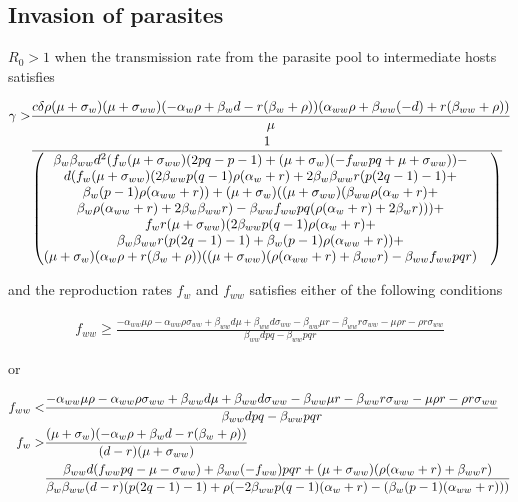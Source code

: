 \documentclass[11pt]{article}
\begin{document}
\subsection*{Invasion of parasites}

$R_0 > 1$ when the transmission rate from the parasite pool to intermediate hosts satisfies

\begin{align}
	\gamma > & \frac{c \delta  \rho  (\mu + \sigma_w) (\mu + \sigma_{ww}) (-\alpha_w \rho + \beta_w d-r (\beta_w+\rho )) (\alpha_{ww} \rho + \beta_{ww} (-d)+r (\beta_{ww}+\rho ))}{\mu } \notag \\
	& \frac{1}{\begin{pmatrix}
		\beta_w \beta_{ww} d^2 (f_w (\mu +\sigma_{ww}) (2 p q-p-1) + (\mu +\sigma_w) (-f_{ww} p q+\mu +\sigma_{ww})) - & \\
		 d (f_w (\mu +\sigma_{ww}) (2 \beta_{ww} p (q-1) \rho  (\alpha_w+r)+2 \beta_w \beta_{ww} r (p (2 q-1)-1)+ & \\
		 \beta_w (p-1) \rho  (\alpha_{ww}+r)) + (\mu +\sigma_w) ((\mu +\sigma_{ww}) (\beta_{ww} \rho  (\alpha_w+r) + & \\ 
		 \beta_w \rho  (\alpha_{ww}+r)+2 \beta_w \beta_{ww} r)-\beta_{ww} f_{ww} p q (\rho  (\alpha_w+r)+2 \beta_w r))) + & \\
		 f_w r (\mu +\sigma_{ww}) (2 \beta_{ww} p (q-1) \rho  (\alpha_w+r) +  & \\
		 \beta_w \beta_{ww} r (p (2 q-1)-1) + \beta_w (p-1) \rho  (\alpha_{ww}+r)) + & \\
		 (\mu +\sigma_w) (\alpha_w \rho +r (\beta_w+\rho )) ((\mu +\sigma_{ww}) (\rho  (\alpha_{ww}+r)+\beta_{ww} r)-\beta_{ww} f_{ww} p q r)
		\end{pmatrix}}
\end{align}

and the reproduction rates $f_w$ and $f_{ww}$ satisfies either of the following conditions

\begin{align}
f_{ww}\geq \frac{-\alpha_{ww} \mu  \rho -\alpha_{ww} \rho  \sigma_{ww} + \beta_{ww} d \mu +\beta_{ww} d \sigma_{ww}-\beta_{ww} \mu  r-\beta_{ww} r \sigma_{ww}-\mu  \rho  r-\rho  r \sigma_{ww}}{\beta_{ww} d p q-\beta_{ww} p q r}
\end{align}

or

\begin{align}
	f_{ww} < & \frac{-\alpha_{ww} \mu  \rho -\alpha_{ww} \rho  \sigma_{ww} + \beta_{ww} d \mu +\beta_{ww} d \sigma_{ww}-\beta_{ww} \mu  r-\beta_{ww} r \sigma_{ww}-\mu  \rho  r-\rho  r \sigma_{ww}}{\beta_{ww} d p q-\beta_{ww} p q r} \notag \\
	f_w > & \frac{(\mu +\sigma_w) (-\alpha_w \rho + \beta_w d-r (\beta_w+\rho ))}{(d-r) (\mu + \sigma_{ww})} \notag \\
	& \frac{\beta_{ww} d (f_{ww} p q-\mu -\sigma_{ww})+\beta_{ww} (-f_{ww}) p q r+(\mu +\sigma_{ww}) (\rho  (\alpha_{ww}+r)+\beta_{ww} r)}{\beta_w \beta_{ww} (d-r) (p (2 q-1)-1)+\rho  (-2 \beta_{ww} p (q-1) (\alpha_w+r)-(\beta_w (p-1) (\alpha_{ww}+r)))} 
\end{align}
\end{document}
